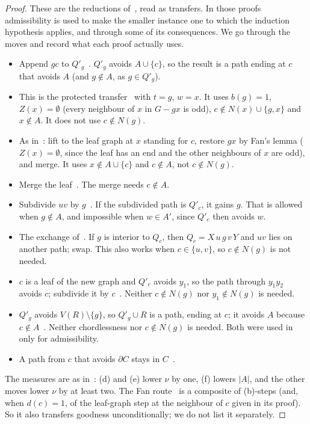 \documentclass[11pt]{amsart}
\theoremstyle{definition}
\begin{document}
\begin{proof}
These are the reductions of~\cite[Theorem~4.2, Lemma~5.1, Propositions~5.2,~5.4,~5.5]{L1S}, read as
transfers. In those proofs admissibility is used to make the smaller instance one to which the
induction hypothesis applies, and through some of its consequences. We go through the moves and
record what each proof actually uses.
\begin{itemize}
\item[(a)] Append $gc$ to $Q'_g$~\cite[Thm~4.2(a)]{L1S}. $Q'_g$ avoids $A\cup\{c\}$, so the result is
a path ending at $c$ that avoids $A$ (and $g\notin A$, as $g\in Q'_g$).
\item[(b)] This is the protected transfer~\cite[Lemma~2.4]{L1S} with $t=g$, $w=x$. It uses
$b(g)=1$, $Z(x)=\emptyset$ (every neighbour of $x$ in $G-gx$ is odd), $c\notin N(x)\cup\{g,x\}$ and
$x\notin A$. It does not use $c\notin N(g)$.
\item[(c)] As in~\cite[Thm~4.2(c)]{L1S}: lift to the leaf graph at $x$ standing for $c$, restore $gx$
by Fan's lemma ($Z(x)=\emptyset$, since the leaf has an end and the other neighbours of $x$ are odd),
and merge. It uses $x\notin A\cup\{c\}$ and $c\notin A$, not $c\notin N(g)$.
\item[(d)] Merge the leaf~\cite[Thm~4.2(d)]{L1S}. The merge needs $c\notin A$.
\item[(e)] Subdivide $uv$ by $g$~\cite[Prop.~5.4(i)]{L1S}. If the subdivided path is $Q'_c$, it gains
$g$. That is allowed when $g\notin A$, and impossible when $w\in A'$, since $Q'_c$ then avoids $w$.
\item[(f)] The exchange of~\cite[Prop.~5.4(ii)]{L1S}. If $g$ is interior to $Q_c$, then $Q_c=X\,u\,g\,v\,Y$
and $uv$ lies on another path; swap. This also works when $c\in\{u,v\}$, so $c\notin N(g)$ is not
needed.
\item[(g)] $c$ is a leaf of the new graph and $Q'_c$ avoids $y_1$, so the path through $y_1y_2$ avoids
$c$; subdivide it by $c$~\cite[Prop.~5.5]{L1S}. Neither $c\notin N(g)$ nor $y_1\notin N(g)$ is
needed.
\item[(h)] $Q'_g$ avoids $V(R)\setminus\{g\}$, so $Q'_g\cup R$ is a path, ending at $c$; it avoids $A$
because $c\notin A$~\cite[Prop.~5.2]{L1S}. Neither chordlessness nor $c\notin N(g)$ is needed. Both
were used in~\cite{L1S} only for admissibility.
\item[(i)] A path from $c$ that avoids $\partial C$ stays in $C$~\cite[Lemma~5.1]{L1S}.
\end{itemize}
The measures are as in~\cite{L1S}: (d) and (e) lower $\nu$ by one, (f) lowers $|A|$, and the other
moves lower $\nu$ by at least two. The Fan route~\cite[Prop.~5.3]{L1S} is a composite of (b)-steps
(and, when $d(c)=1$, of the leaf-graph step at the neighbour of $c$ given in its proof). So it also
transfers goodness unconditionally; we do not list it separately.
\end{proof}
\end{document}

